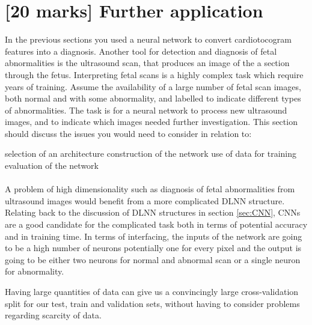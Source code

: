 \documentclass[11pt,a4paper]{article}
\begin{document}
\section{[20 marks] Further application}

\label{sec:further}
In the previous sections you used a neural network to convert cardiotocogram features into a diagnosis. Another tool for detection and diagnosis of fetal abnormalities is the ultrasound scan, that produces an image of the a section through the fetus. Interpreting fetal scans is a highly complex task which require years of training. Assume the availability of a large number of fetal scan images, both normal and with some abnormality, and labelled to indicate different types of abnormalities. The task is for a neural network to process new ultrasound images, and to indicate which images needed further investigation. This section should discuss the issues you would need to consider in relation to:
\begin{outline}
  \1 selection of an architecture
  \1 construction of the network
  \1 use of data for training
  \1 evaluation of the network
\end{outline}

\paragraph{}
A problem of high dimensionality such as diagnosis of fetal abnormalities from ultrasound images would benefit from a more complicated DLNN structure.
Relating back to the discussion of DLNN structures in section \ref{sec:CNN}, CNNs are a good candidate for the complicated task both in terms of potential accuracy and in training time. In terms of interfacing, the inputs of the network are going to be a high number of neurons potentially one for every pixel and the output is going to be either two neurons for normal and abnormal scan or a single neuron for abnormality.

Having large quantities of data can give us a convincingly large cross-validation split for our test, train and validation sets, without having to consider problems regarding scarcity of data.

\end{document}
